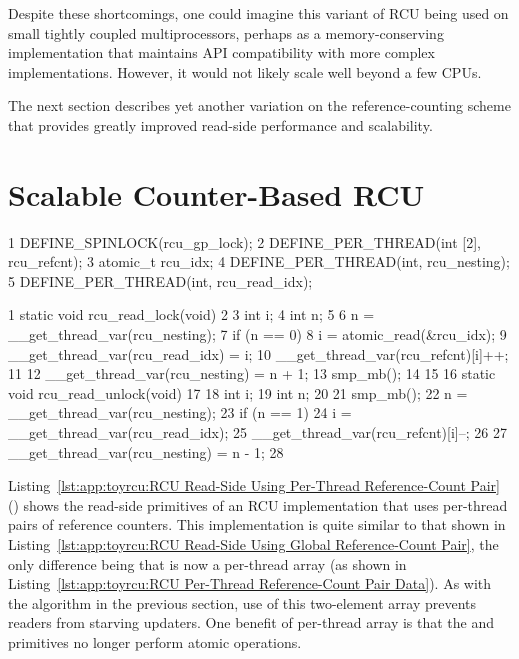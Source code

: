 Despite these shortcomings, one could imagine this variant
of RCU being used on small tightly coupled multiprocessors,
perhaps as a memory-conserving implementation that maintains
API compatibility with more complex implementations.
However, it would not likely scale well beyond a few CPUs.

The next section describes yet another variation on the reference-counting
scheme that provides greatly improved read-side performance and scalability.

\section{Scalable Counter-Based RCU}
\label{sec:app:toyrcu:Scalable Counter-Based RCU}

\begin{listing}[tb]
{ \scriptsize
\begin{verbbox}
  1 DEFINE_SPINLOCK(rcu_gp_lock);
  2 DEFINE_PER_THREAD(int [2], rcu_refcnt);
  3 atomic_t rcu_idx;
  4 DEFINE_PER_THREAD(int, rcu_nesting);
  5 DEFINE_PER_THREAD(int, rcu_read_idx);
\end{verbbox}
}
\centering
\theverbbox
\caption{RCU Per-Thread Reference-Count Pair Data}
\label{lst:app:toyrcu:RCU Per-Thread Reference-Count Pair Data}
\end{listing}

\begin{listing}[tb]
{ \scriptsize
\begin{verbbox}
  1 static void rcu_read_lock(void)
  2 {
  3   int i;
  4   int n;
  5
  6   n = __get_thread_var(rcu_nesting);
  7   if (n == 0) {
  8     i = atomic_read(&rcu_idx);
  9     __get_thread_var(rcu_read_idx) = i;
 10     __get_thread_var(rcu_refcnt)[i]++;
 11   }
 12   __get_thread_var(rcu_nesting) = n + 1;
 13   smp_mb();
 14 }
 15
 16 static void rcu_read_unlock(void)
 17 {
 18   int i;
 19   int n;
 20
 21   smp_mb();
 22   n = __get_thread_var(rcu_nesting);
 23   if (n == 1) {
 24      i = __get_thread_var(rcu_read_idx);
 25      __get_thread_var(rcu_refcnt)[i]--;
 26   }
 27   __get_thread_var(rcu_nesting) = n - 1;
 28 }
\end{verbbox}
}
\centering
\theverbbox
\caption{RCU Read-Side Using Per-Thread Reference-Count Pair}
\label{lst:app:toyrcu:RCU Read-Side Using Per-Thread Reference-Count Pair}
\end{listing}

Listing~\ref{lst:app:toyrcu:RCU Read-Side Using Per-Thread Reference-Count Pair}
()
shows the read-side primitives of an RCU implementation that uses per-thread
pairs of reference counters.
This implementation is quite similar to that shown in
Listing~\ref{lst:app:toyrcu:RCU Read-Side Using Global Reference-Count Pair},
the only difference being that  is now a per-thread
array (as shown in
Listing~\ref{lst:app:toyrcu:RCU Per-Thread Reference-Count Pair Data}).
As with the algorithm in the previous section, use of this two-element
array prevents readers from starving updaters.
One benefit of per-thread  array is that the
 and  primitives no longer
perform atomic operations.

